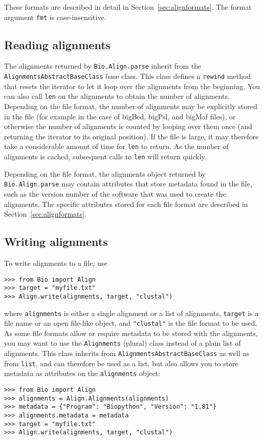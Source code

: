 These formats are described in detail in Section~\ref{sec:alignformats}. The format argument \verb|fmt| is case-insensitive.

\subsection{Reading alignments}

The alignments returned by \verb|Bio.Align.parse| inherit from the \verb|AlignmentsAbstractBaseClass| base class. This class defines a \verb|rewind| method that resets the iterator to let it loop over the alignments from the beginning. You can also call \verb|len| on the alignments to obtain the number of alignments. Depending on the file format, the number of alignments may be explicitly stored in the file (for example in the case of bigBed, bigPsl, and bigMaf files), or otherwise the number of alignments is counted by looping over them once (and returning the iterator to its original position). If the file is large, it may therefore take a considerable amount of time for \verb|len| to return. As the number of alignments is cached, subsequent calls to \verb|len| will return quickly.

Depending on the file format, the alignments object returned by \verb|Bio.Align.parse| may contain attributes that store metadata found in the file, such as the version number of the software that was used to create the alignments. The specific attributes stored for each file format are described in Section~\ref{sec:alignformats}.

\subsection{Writing alignments}
\label{subsec:align_writing}

To write alignments to a file, use
\begin{verbatim}
>>> from Bio import Align
>>> target = "myfile.txt"
>>> Align.write(alignments, target, "clustal")
\end{verbatim}
where \verb|alignments| is either a single alignment or a list of alignments, \verb|target| is a file name or an open file-like object, and \verb|"clustal"| is the file format to be used. As some file formats allow or require metadata to be stored with the alignments, you may want to use the \verb|Alignments| (plural) class instead of a plain list of alignments. This class inherits from \verb|AlignmentsAbstractBaseClass| as well as from \verb|list|, and can therefore be used as a list, but also allows you to store metadata as attributes on the \verb|alignments| object:
\begin{verbatim}
>>> from Bio import Align
>>> alignments = Align.Alignments(alignments)
>>> metadata = {"Program": "Biopython", "Version": "1.81"}
>>> alignments.metadata = metadata
>>> target = "myfile.txt"
>>> Align.write(alignments, target, "clustal")
\end{verbatim}

